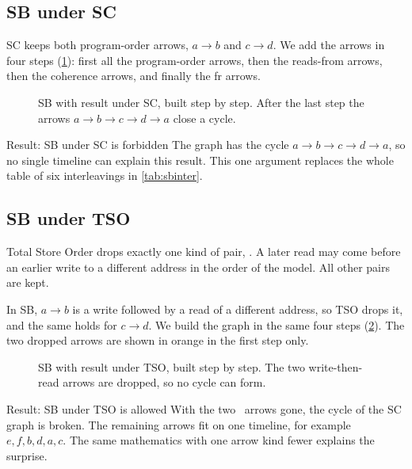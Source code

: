 \subsection{SB under SC}
\label{sec:sbsc}

SC keeps both program-order arrows, $a \to b$ and $c \to d$. We add the arrows in four steps (\cref{fig:sbsc}): first all the program-order arrows, then the reads-from arrows, then the coherence arrows, and finally the \gls{fr} arrows.

\begin{figure}[H]
\centering
{}
\caption{SB with result  under SC, built step by step. After the last step the arrows $a \to b \to c \to d \to a$ close a cycle.}
\label{fig:sbsc}
\end{figure}

\begin{forbidbox}{Result: SB  under SC is forbidden}
The graph has the cycle $a \to b \to c \to d \to a$, so no single timeline can explain this result. This one argument replaces the whole table of six interleavings in \cref{tab:sbinter}.
\end{forbidbox}

\subsection{SB under TSO}
\label{sec:tso}
\label{sec:sbtso}

Total Store Order drops exactly one kind of pair, \WR. A later read may come before an earlier write to a different address in the order of the model. All other pairs are kept.

In SB, $a \to b$ is a write followed by a read of a different address, so TSO drops it, and the same holds for $c \to d$. We build the graph in the same four steps (\cref{fig:sbtso}). The two dropped arrows are shown in orange in the first step only.

\begin{figure}[H]
\centering
{}
\caption{SB with result  under TSO, built step by step. The two write-then-read arrows are dropped, so no cycle can form.}
\label{fig:sbtso}
\end{figure}

\begin{resultbox}{Result: SB  under TSO is allowed}
With the two \WR\ arrows gone, the cycle of the SC graph is broken. The remaining arrows fit on one timeline, for example $e, f, b, d, a, c$. The same mathematics with one arrow kind fewer explains the surprise.
\end{resultbox}

